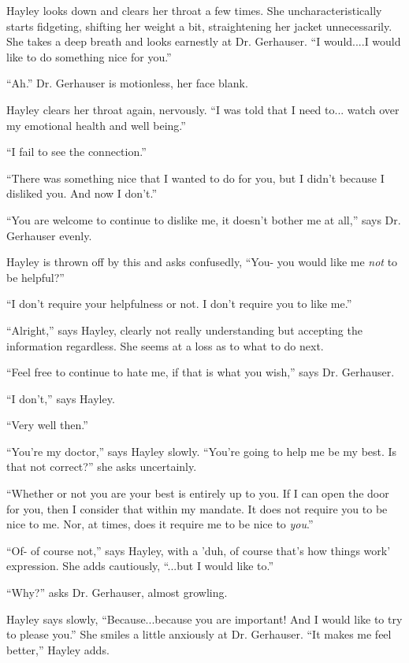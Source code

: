 Hayley looks down and clears her throat a few times. She uncharacteristically starts fidgeting, shifting her weight a bit, straightening her jacket unnecessarily.  She takes a deep breath and looks earnestly at Dr. Gerhauser. ``I would....I would like to do something nice for you.''

``Ah.''  Dr. Gerhauser is motionless, her face blank.

Hayley clears her throat again, nervously.  ``I was told that I need to... watch over my emotional health and well being.''

``I fail to see the connection.''

``There was something nice that I wanted to do for you, but I didn't because I disliked you.  And now I don't.''

``You are welcome to continue to dislike me, it doesn't bother me at all,'' says Dr. Gerhauser evenly.

Hayley is thrown off by this and asks confusedly, ``You- you would like me \textit{not} to be helpful?''

``I don't require your helpfulness or not.  I don't require you to like me.''

``Alright,'' says Hayley, clearly not really understanding but accepting the information regardless.  She seems at a loss as to what to do next.

``Feel free to continue to hate me, if that is what you wish,'' says Dr. Gerhauser.

``I don't,'' says Hayley.

``Very well then.''

``You're my doctor,'' says Hayley slowly. ``You're going to help me be my best.  Is that not correct?'' she asks uncertainly.

``Whether or not you are your best is entirely up to you.  If I can open the door for you, then I consider that within my mandate. It does not require you to be nice to me.  Nor, at times, does it require me to be nice to \textit{you}.''

``Of- of course not,'' says Hayley, with a 'duh, of course that's how things work' expression.  She adds cautiously, ``...but I would like to.''

``Why?'' asks Dr. Gerhauser, almost growling.

Hayley says slowly, ``Because...because you are important!  And I would like to try to please you.''  She smiles a little anxiously at Dr. Gerhauser.  ``It makes me feel better,'' Hayley adds.


